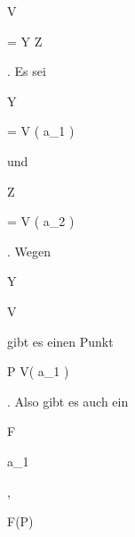{{{\vergleichskette


{ V
}


{ = }{ Y \cup Z
}


{  }{
}


{    }{
}


{   }{
}


}
{}{}{.}
Es sei


\mavergleichskette


{\vergleichskette


{ Y
}


{ = }{ V \left(  {\mathfrak a}_1   \right)
}


{  }{
}


{    }{
}


{   }{
}


}
{}{}{}
und


\mavergleichskette


{\vergleichskette


{ Z
}


{ = }{ V \left(  {\mathfrak a}_2  \right)
}


{  }{
}


{    }{
}


{   }{
}


}
{}{}{.}
Wegen


\mavergleichskette


{\vergleichskette


{ Y
}


{ \subset }{ V
}


{  }{
}


{    }{
}


{   }{
}


}
{}{}{}
gibt es einen Punkt


 {}


 {P \not\in V( {\mathfrak a}_1 )} {}


 {} {} {} {.}
Also gibt es auch ein


\mavergleichskette


{\vergleichskette


{ F
}


{ \in }{ {\mathfrak a}_1
}


{  }{
}


{    }{
}


{   }{
}


}
{}{}{,}


\mavergleichskette


{\vergleichskette


{ F(P)
}


}}}
